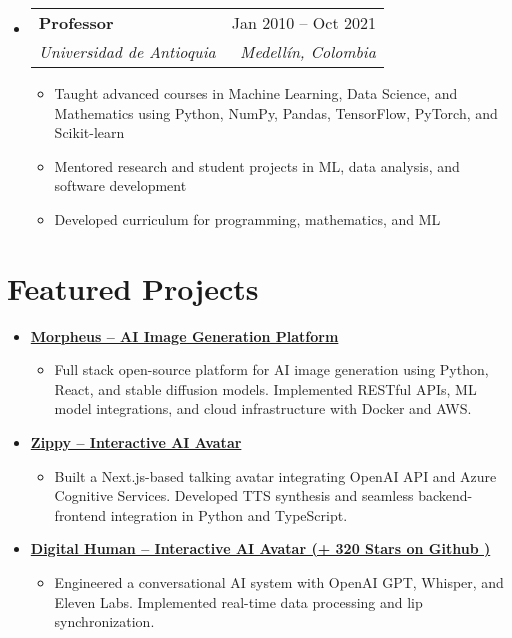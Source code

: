 \documentclass[letterpaper,11pt]{article}
\makeatletter
\newcommand{\resumeSubheading}[4]{
  \vspace{-2pt}
  \item[]
  \begin{tabular*}{\textwidth}{@{\extracolsep{\fill}}l r}
    \textbf{#1} & #2 \\
    \textit{#3} & \textit{#4} \\
  \end{tabular*}
  \vspace{-5pt}
}
\newcommand{\normalfaExternalLink}{{\mdseries\faExternalLink}}
\makeatother
\begin{document}
\begin{itemize}[leftmargin=0pt, itemindent=0pt, label={}, itemsep=1pt]
\resumeSubheading
{Professor}{Jan 2010 -- Oct 2021}
{Universidad de Antioquia}{Medellín, Colombia}
\begin{itemize}[leftmargin=*, itemsep=0pt]
    \item Taught advanced courses in Machine Learning, Data Science, and Mathematics using Python, NumPy, Pandas, TensorFlow, PyTorch, and Scikit-learn
    \item Mentored research and student projects in ML, data analysis, and software development
    \item Developed curriculum for programming, mathematics, and ML
\end{itemize}
\end{itemize}

\section{Featured Projects}
\begin{itemize}[leftmargin=*, itemsep=1pt]
    \item \textbf{\href{https://github.com/Monadical-SAS/Morpheus}{Morpheus -- AI Image Generation Platform \normalfaExternalLink}}
    \begin{itemize}[itemsep=0pt]
        \item Full stack open-source platform for AI image generation using Python, React, and stable diffusion models. Implemented RESTful APIs, ML model integrations, and cloud infrastructure with Docker and AWS.
    \end{itemize}
    \item \textbf{\href{https://github.com/asanchezyali/ai-avatar}{Zippy -- Interactive AI Avatar \normalfaExternalLink}}
    \begin{itemize}[itemsep=0pt]
        \item Built a Next.js-based talking avatar integrating OpenAI API and Azure Cognitive Services. Developed TTS synthesis and seamless backend-frontend integration in Python and TypeScript.
    \end{itemize}
    \item \textbf{\href{https://github.com/asanchezyali/talking-avatar-with-ai}{Digital Human -- Interactive AI Avatar (+
        320 Stars on Github )\normalfaExternalLink}}
    \begin{itemize}[itemsep=0pt]
        \item Engineered a conversational AI system with OpenAI GPT, Whisper, and Eleven Labs. Implemented real-time data processing and lip synchronization.
    \end{itemize}
\end{itemize}
\end{document}
